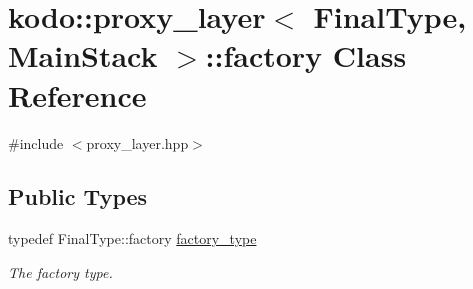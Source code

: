 \hypertarget{classkodo_1_1proxy__layer_1_1factory}{\section{kodo\-:\-:proxy\-\_\-layer$<$ Final\-Type, Main\-Stack $>$\-:\-:factory Class Reference}
\label{classkodo_1_1proxy__layer_1_1factory}
}


{\ttfamily \#include $<$proxy\-\_\-layer.\-hpp$>$}

\subsection*{Public Types}
\begin{DoxyCompactItemize}
\item 
\hypertarget{classkodo_1_1proxy__layer_1_1factory_aaac7dc2d13365dadf2cbe31f366a8d15}{typedef Final\-Type\-::factory \hyperlink{classkodo_1_1proxy__layer_1_1factory_aaac7dc2d13365dadf2cbe31f366a8d15}{factory\-\_\-type}}\label{classkodo_1_1proxy__layer_1_1factory_aaac7dc2d13365dadf2cbe31f366a8d15}

\begin{DoxyCompactList}\small\item\em The factory type. \end{DoxyCompactList}\end{DoxyCompactItemize}
